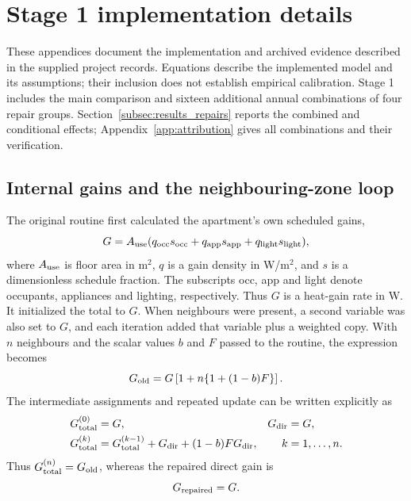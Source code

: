 \makeatletter
{}
\makeatother
\setlength{\emergencystretch}{2em}
\clearpage
\appendix
\renewcommand{\thesubsection}{\thesection\arabic{subsection}}
\section{Stage 1 implementation details}
\label{app:stage1}
These appendices document the implementation and archived evidence described in the supplied project records. Equations describe the implemented model and its assumptions; their inclusion does not establish empirical calibration. Stage 1 includes the main comparison and sixteen additional annual combinations of four repair groups. Section~\ref{subsec:results_repairs} reports the combined and conditional effects; Appendix~\ref{app:attribution} gives all combinations and their verification.

\subsection{Internal gains and the neighbouring-zone loop}
\label{app:gains}
The original routine first calculated the apartment's own scheduled gains,
\begin{equation}
G=A_{\rm use}(q_{\rm occ}s_{\rm occ}+q_{\rm app}s_{\rm app}+q_{\rm light}s_{\rm light}),
\end{equation}
where $A_{\rm use}$ is floor area in m$^2$, $q$ is a gain density in W/m$^2$, and $s$ is a dimensionless schedule fraction. The subscripts occ, app and light denote occupants, appliances and lighting, respectively. Thus $G$ is a heat-gain rate in W. It initialized the total to $G$. When neighbours were present, a second variable was also set to $G$, and each iteration added that variable plus a weighted copy. With $n$ neighbours and the scalar values $b$ and $F$ passed to the routine, the expression becomes
\begin{equation}
G_{\rm old}=G\left[1+n\{1+(1-b)F\}\right].
\end{equation}
The intermediate assignments and repeated update can be written explicitly as
\begin{align}
G_{\rm total}^{(0)}&=G, & G_{\rm dir}&=G,\\
G_{\rm total}^{(k)}&=G_{\rm total}^{(k-1)}
+G_{\rm dir}+(1-b)F G_{\rm dir}, & k&=1,\ldots,n.
\end{align}
Thus $G_{\rm total}^{(n)}=G_{\rm old}$, whereas the repaired direct gain is
\begin{equation}
G_{\rm repaired}=G.
\end{equation}

